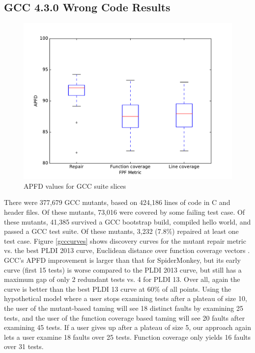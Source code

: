 \subsection{GCC 4.3.0 Wrong Code Results}


\begin{figure}
  \centering
  \includegraphics[width=\columnwidth]{comparegcc}
  \caption{APFD values for GCC suite slices}
  \label{comparegcc}
\end{figure}%

There were 377,679 GCC mutants, based on 424,186 lines of code in C and header files. Of these mutants, 73,016 were covered by some failing test case.  Of these mutants, 41,385 survived a GCC bootstrap build, compiled hello world, and passed a GCC test suite.  Of these mutants, 3,232 (7.8\%) repaired at least one test case.  Figure \ref{gcccurves} shows discovery curves for the mutant repair metric vs. the best PLDI 2013 curve, Euclidean distance over function coverage vectors \cite{PLDI13}.  GCC's APFD improvement is larger than that for SpiderMonkey, but its early curve (first 15 tests) is worse compared to the PLDI 2013 curve, but still has a maximum gap of only 2 redundant tests vs. 4 for PLDI 13.  Over all, again the curve is better than the best PLDI 13 curve at 60\% of all points.  Using the hypothetical model where a user stops examining tests after a plateau of size 10, the user of the mutant-based taming will see 18 distinct faults by examining 25 tests, and the user of the function coverage based taming will see 20 faults after examining 45 tests.  If a user gives up after a plateau of size 5, our approach again lets a user examine 18 faults over 25 tests.  Function coverage only yields 16 faults over 31 tests. 


